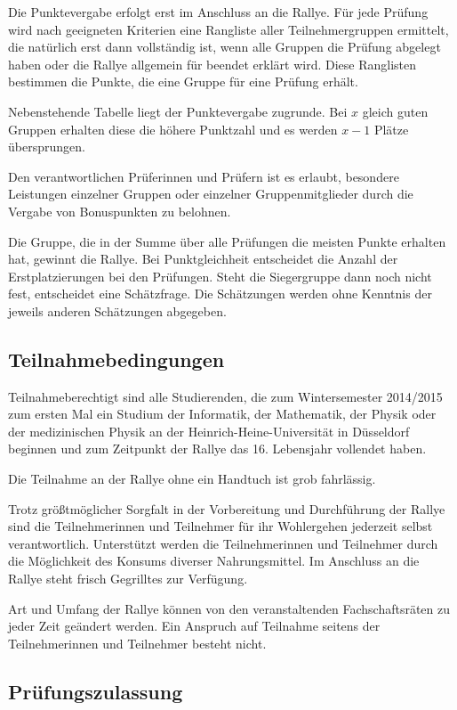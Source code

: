 \documentclass[a4paper,10pt]{article}
\begin{document}
Die Punktevergabe erfolgt erst im Anschluss an die Rallye. Für jede
Prüfung wird nach geeigneten Kriterien eine Rangliste aller
Teilnehmergruppen ermittelt, die natürlich erst dann vollständig ist,
wenn alle Gruppen die Prüfung abgelegt haben oder die Rallye allgemein
für beendet erklärt wird. Diese Ranglisten bestimmen die Punkte, die
eine Gruppe für eine Prüfung erhält.

Nebenstehende Tabelle liegt der Punktevergabe zugrunde. Bei $x$ gleich
guten Gruppen erhalten diese die höhere Punktzahl und es werden $x-1$ Plätze
übersprungen.

Den verantwortlichen Prüferinnen und Prüfern ist es erlaubt, besondere
Leistungen einzelner Gruppen oder einzelner Gruppenmitglieder durch die
Vergabe von Bonuspunkten zu belohnen.

Die Gruppe, die in der Summe über alle Prüfungen die meisten Punkte
erhalten hat, gewinnt die Rallye. Bei Punktgleichheit entscheidet die
Anzahl der Erstplatzierungen bei den Prüfungen. Steht die Siegergruppe
dann noch nicht fest, entscheidet eine Schätzfrage. Die Schätzungen
werden ohne Kenntnis der jeweils anderen Schätzungen abgegeben.

\subsection{Teilnahmebedingungen}

Teilnahmeberechtigt sind alle Studierenden, die zum Wintersemester 
2014/2015 zum ersten Mal ein Studium der
Informatik, der Mathematik, der Physik oder der medizinischen Physik an
der Heinrich-Heine-Universität in Düsseldorf beginnen und zum Zeitpunkt
der Rallye das 16. Lebensjahr vollendet haben.

Die Teilnahme an der Rallye ohne ein Handtuch ist grob fahrlässig.

Trotz größtmöglicher Sorgfalt in der Vorbereitung und Durchführung der
Rallye sind die Teilnehmerinnen und Teilnehmer für ihr Wohlergehen 
jederzeit selbst verantwortlich. Unterstützt werden die Teilnehmerinnen
und Teilnehmer durch die Möglichkeit des Konsums diverser Nahrungsmittel. 
Im Anschluss an die Rallye steht frisch Gegrilltes zur Verfügung.

Art und Umfang der Rallye können von den veranstaltenden Fachschaftsräten
zu jeder Zeit geändert werden. Ein Anspruch auf Teilnahme seitens der 
Teilnehmerinnen und Teilnehmer besteht nicht.

\subsection{Prüfungszulassung}
\end{document}
